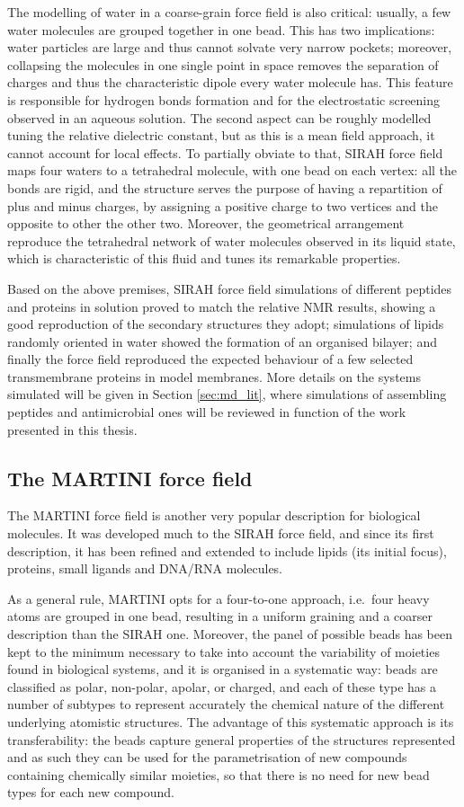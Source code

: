 The modelling of water in a coarse-grain force field is also critical: usually, a few water molecules are grouped together in one bead. This has two implications: water particles are large and thus cannot solvate very narrow pockets; moreover, collapsing the molecules in one single point in space removes the separation of charges and thus the characteristic dipole every water molecule has. This feature is responsible for hydrogen bonds formation and for the electrostatic screening observed in an aqueous solution. The second aspect can be roughly modelled tuning the relative dielectric constant, but as this is a mean field approach, it cannot account for local effects.
%
To partially obviate to that, SIRAH force field maps four waters to a tetrahedral molecule, with one bead on each vertex: all the bonds are rigid, and the structure serves the purpose of having a repartition of plus and minus charges, by assigning a positive charge to two vertices and the opposite to other the other two. Moreover, the geometrical arrangement reproduce the tetrahedral network of water molecules observed in its liquid state, which is characteristic of this fluid and tunes its remarkable properties.

Based on the above premises, SIRAH force field simulations of different peptides and proteins in solution proved to match the relative NMR results, showing a good reproduction of the secondary structures they adopt; simulations of lipids randomly oriented in water showed the formation of an organised bilayer; and finally the force field reproduced the expected behaviour of a few selected transmembrane proteins in model membranes. More details on the systems simulated will be given in Section \ref{sec:md_lit}, where simulations of assembling peptides and antimicrobial ones will be reviewed in function of the work presented in this thesis.

 
\subsection{The MARTINI force field}
The MARTINI force field is another very popular description for biological molecules. It was developed much to the SIRAH force field, and since its first description, it has been refined and extended to include lipids (its initial focus), proteins, small ligands and DNA/RNA molecules.

As a general rule, MARTINI opts for a four-to-one approach, i.e.\ four heavy atoms are grouped in one bead, resulting in a uniform graining and a coarser description than the SIRAH one. Moreover, the panel of possible beads has been kept to the minimum necessary to take into account the variability of moieties found in biological systems, and it is organised in a systematic way: beads are classified as polar, non-polar, apolar, or charged, and each of these type has a number of subtypes to represent accurately the chemical nature of the different underlying atomistic structures.
%
The advantage of this systematic approach is its transferability: the beads capture general properties of the structures represented and as such they can be used for the parametrisation of new compounds containing chemically similar moieties, so that there is no need for new bead types for each new compound.

